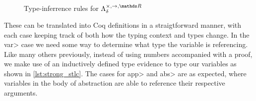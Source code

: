 \documentclass[11pt, final]{article}
\begin{document}
  \begin{figure}
    \caption{Type-inferrence rules for $\lambdaBase$}
    \label{fig:base_infer}
  \end{figure}

  These can be translated into Coq definitions in a straigtforward manner, with each case keeping track of both how the typing context and types change.
  In the \<var> case we need some way to determine what type the variable is referencing.
  Like many others previously\cite{Benton2011}\cite{Coquand1994}, instead of using numbers accompanied with a proof, we make use of an inductively defined type evidence to type our variables as shown in \ref{lst:strong_stlc}.
  The cases for \<app> and \<abs> are as expected, where variables in the body of abstraction are able to reference their respective arguments.
\end{document}
